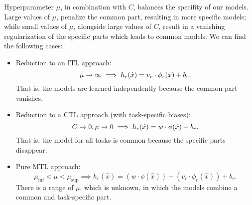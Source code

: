 %
Hyperparameter $\mu$, in combination with $C$, balances the specifity of our models. 
Large values of $\mu$, penalize the common part, resulting in more specific models; while small values of $\mu$, alongside large values of $C$, result in a vanishing regularization of the specific parts which leads to common models.
We can find the following cases:
\begin{itemize}
    \item Reduction to an ITL approach:
    $$\mu \xrightarrow[]{} \infty \implies h_r(\hat{x}) = {v}_r \cdot \phi_r(\hat{x}) + b_r .$$
    That is, the models are learned independently because the common part vanishes.
    \item Reduction to a CTL approach (with task-specific biases): 
    $$C \xrightarrow[]{} 0, \mu \xrightarrow[]{} 0 \implies h_r(\hat{x}) = {w} \cdot \phi(\hat{x}) + b_r .$$
    That is, the model for all tasks is common because the specific parts disappear.
    \item Pure MTL approach:
    $$ \mu_\text{inf} < \mu < \mu_\text{sup} \implies h_r(\hat{x}) =({w} \cdot \phi(\hat{x}) ) + ({v}_r \cdot \phi_r(\hat{x})) + b_r .$$
    There is a range of $\mu$, which is unknown, in which the models combine a common and task-specific part.
\end{itemize}

